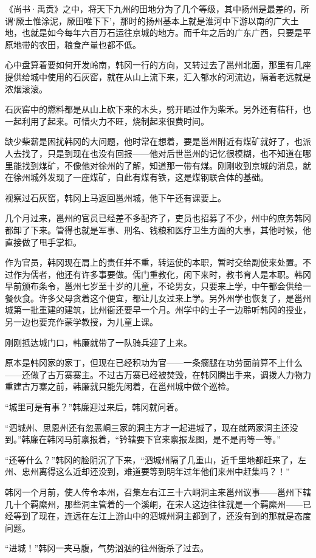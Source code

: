 《尚书·禹贡》之中，将天下九州的田地分为了几个等级，其中扬州是最差的，所谓‘厥土惟涂泥，厥田唯下下’，那时的扬州基本上就是淮河中下游以南的广大土地，也就是如今每年六百万石运往京城的地方。而千年之后的广东广西，只要是平原地带的农田，粮食产量也都不低。

心中盘算着要如何开发岭南，韩冈一行的方向，又转过去了邕州北面，那里有几座提供给城中使用的石灰窑，就在从山上流下来，汇入郁水的河流边，隔着老远就是浓烟滚滚。

石灰窑中的燃料都是从山上砍下来的木头，劈开晒过作为柴禾。另外还有秸秆，也一起利用了起来。可惜火力不旺，烧制起来很费时间。

缺少柴薪是困扰韩冈的大问题，他时常在想着，要是邕州附近有煤矿就好了，也派人去找了，只是到现在也没有回报——他对后世邕州的记忆很模糊，也不知道在哪里能找到煤矿，不像他对徐州的了解，知道那一带有煤。刚刚收到京城的消息，就在徐州城外发现了一座煤矿，自此有煤有铁，这是煤钢联合体的基础。

视察过石灰窑，韩冈上马返回邕州城，他下午还有课要上。

几个月过来，邕州的官员已经差不多配齐了，吏员也招募了不少，州中的庶务韩冈都卸了下来。管得也就是军事、刑名、钱粮和医疗卫生方面的大事，其他时候，他直接做了甩手掌柜。

作为官员，韩冈现在肩上的责任并不重，转运使的本职，暂时交给副使来处置。不过作为儒者，他还有许多事要做。儒门重教化，闲下来时，教书育人是本职。韩冈早前颁布条令，邕州七岁至十岁的儿童，不论男女，只要来上学，中午都会供给一餐伙食。许多父母贪着这个便宜，都让儿女过来上学。另外州学也恢复了，是邕州城第一批重建的建筑，比州衙还要早一个月。州学中的士子一边聆听韩冈的授业，另一边也要充作蒙学教授，为儿童上课。

刚刚抵达城门口，韩廉就带了一队骑兵迎了上来。

原本是韩冈家的家丁，但现在已经积功为官——一条瘸腿在功劳面前算不上什么——还做了古万寨寨主。不过古万寨已经被焚毁，在韩冈腾出手来，调拨人力物力重建古万寨之前，韩廉就只能先闲着，在邕州城中做个巡检。

“城里可是有事？”韩廉迎过来后，韩冈就问着。

“泗城州、思恩州还有忽恶峒三家的洞主方才一起进城了，现在就两家洞主还没到。”韩廉在韩冈马前禀报着，“钤辖要下官来禀报龙图，是不是再等一等。”

“还等什么？”韩冈的脸阴沉了下来，“泗城州隔了几重山，近千里地都赶来了，左州、忠州离得这么近却还没到，难道要等到明年过年他们来州中赶集吗？！”

韩冈一个月前，使人传令本州，召集左右江三十六峒洞主来邕州议事——邕州下辖几十个羁縻州，那些洞主管着的一个溪峒，在宋人这边往往就是一个羁縻州——已经等到了现在，连远在左江上游山中的泗城州洞主都到了，还没有到的那就是态度问题。

“进城！”韩冈一夹马腹，气势汹汹的往州衙杀了过去。

